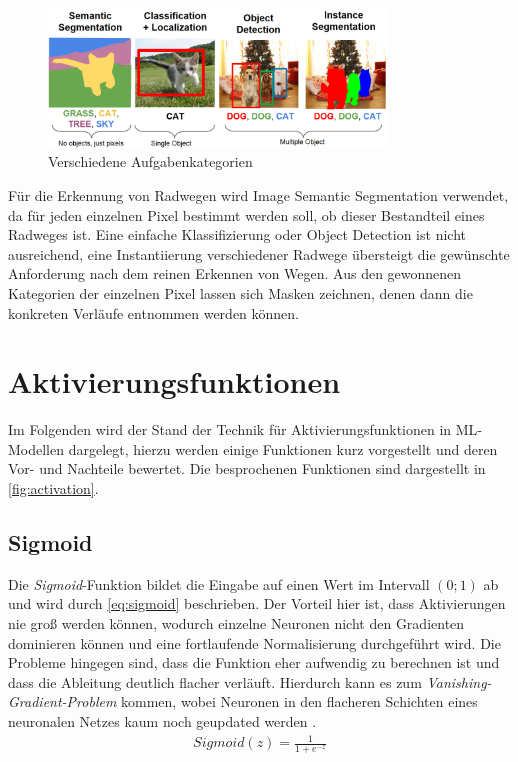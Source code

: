 \begin{figure}
	\centering
	\includegraphics[width=0.8\textwidth]{Bilder/categories.png} 
	\caption{Verschiedene Aufgabenkategorien \cite{.10.11.2022}}
	\label{fig:categories}
\end{figure} 

Für die Erkennung von Radwegen wird Image Semantic Segmentation verwendet, da für jeden einzelnen Pixel bestimmt werden soll, ob dieser Bestandteil eines Radweges ist.
Eine einfache Klassifizierung oder Object Detection ist nicht ausreichend, eine Instantiierung verschiedener Radwege übersteigt die gewünschte Anforderung nach dem reinen Erkennen von Wegen.
Aus den gewonnenen Kategorien der einzelnen Pixel lassen sich Masken zeichnen, denen dann die konkreten Verläufe entnommen werden können.

\section{Aktivierungsfunktionen}

Im Folgenden wird der Stand der Technik für Aktivierungsfunktionen in \ac{ML}-Modellen dargelegt,
hierzu werden einige Funktionen kurz vorgestellt und deren Vor- und Nachteile bewertet. 
Die besprochenen Funktionen sind dargestellt in \autoref{fig:activation}.

\subsection{Sigmoid}

Die \textit{Sigmoid}-Funktion bildet die Eingabe auf einen Wert im Intervall $(0;1)$ ab und wird durch \autoref{eq:sigmoid} beschrieben.
Der Vorteil hier ist, dass Aktivierungen nie groß werden können, wodurch einzelne Neuronen nicht den Gradienten dominieren können und 
eine fortlaufende Normalisierung durchgeführt wird. Die Probleme hingegen sind, dass die Funktion eher aufwendig zu berechnen ist 
und dass die Ableitung deutlich flacher verläuft. Hierdurch kann es zum \textit{Vanishing-Gradient-Problem} kommen, wobei 
Neuronen in den flacheren Schichten eines neuronalen Netzes kaum noch geupdated werden \cite[S.~191--192]{Goodfellow.2016}. 
\begin{align}
	\label{eq:sigmoid} Sigmoid(z) = \frac{1}{1+e^{-z}}
\end{align} 

